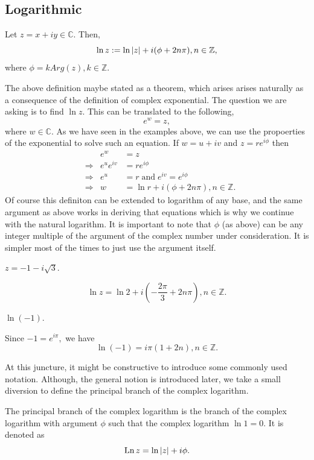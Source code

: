\documentclass[12pt]{book}
\begin{document}
\subsection{Logarithmic}
\begin{defn}
    Let $z = x + iy \in \mathbb{C}.$ Then,
    \[
        \ln z := \ln \left\lvert z \right\rvert + i (\phi + 2n\pi), n \in \mathbb{Z},
    \]
    where $\phi = k Arg(z), k \in \mathbb{Z}.$ 
\end{defn}
The above definition maybe stated as a theorem, which arises arises naturally as a consequence of the definition of complex exponential. The question we are asking is to find $\ln z.$ This can be translated to the following, 
\[
    e^{w} = z,
\]
where $w \in \mathbb{C}.$ As we have seen in the examples above, we can use the propoerties of the exponential to solve such an equation.
If $w = u + iv$ and $z = re^{i\phi}$ then 
\begin{align*}
    &&e^{w} 
        &= 
            z \\
    &\Rightarrow &e^{u}e^{iv}
        &=
            re^{i\phi} \\
    &\Rightarrow &e^{u}
        &=
            r\;
    \text{and}\;
    e^{iv}
        =
            e^{i\phi} \\
    &\Rightarrow &w 
        &= 
            \ln r + i(\phi + 2n\pi), n \in \mathbb{Z}.
\end{align*}
Of course this definiton can be extended to logarithm of any base, and the same argument as above works in deriving that equations which is why we continue with the natural logarithm. It is important to note that $\phi$ (as above) can be any integer multiple of the argument of the complex number under consideration. It is simpler most of the times to just use the argument itself. 

\begin{exmp}
    $z = -1 - i\sqrt{3}.$
\end{exmp}
\[
    \ln z = \ln 2 + i\left(-\frac{2\pi}{3} + 2n\pi\right), n \in \mathbb{Z}.
\]

\begin{exmp}
    $\ln(-1).$
\end{exmp}
Since $-1 = e^{i\pi},$ we have
\[
    \ln(-1) = i\pi\left(1 + 2n\right), n \in \mathbb{Z}.
\]

At this juncture, it might be constructive to introduce some commonly used notation. Although, the general notion is introduced later, we take a small diversion to define the principal branch of the complex logarithm.
\begin{defn}
   The principal branch of the complex logarithm is the branch of the complex logarithm with argument $\phi$ such that the complex logarithm $\ln 1 = 0.$ It is denoted as 
   \[
        \text{Ln}\, z = \ln \left\lvert z \right\rvert + i\phi.
    \]
\end{defn}
\end{document}
